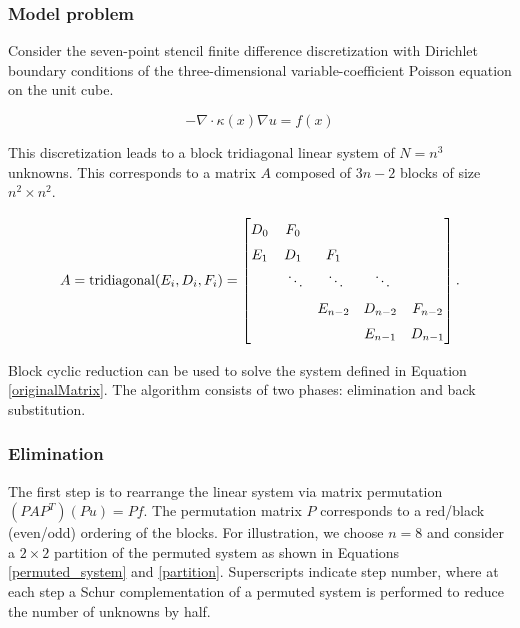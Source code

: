 \documentclass[]{elsarticle}
\begin{document}
\subsubsection{Model problem}

Consider the seven-point stencil finite difference discretization with Dirichlet boundary conditions of the three-dimensional variable-coefficient Poisson equation on the unit cube.

\begin{equation}
-\nabla \cdot \kappa(x) \nabla u=f(x)
\label{probSta}
\end{equation}

This discretization leads to a block tridiagonal linear system of $N=n^3$ unknowns. This corresponds to a matrix $A$ composed of $3n-2$ blocks of size $n^2 \times n^2$.

\begin{equation}
{\renewcommand{\arraystretch}{1.5}
A = \mbox{tridiagonal}(E_{i},D_{i},F_{i}) =
\begin{bmatrix}
D_0 		& F_0 		&  			&  			&  			\\
E_1 		& D_1 		& F_1 		& 			& 			\\
			& ~\ddots 	& ~\ddots 	& ~\ddots 	& 			\\
			&  			& E_{n-2} 	& D_{n-2} 	& F_{n-2} 	\\
			&  			&  			& E_{n-1} 	& D_{n-1} 	\\
\end{bmatrix}.
}
\label{originalMatrix}
\end{equation}

Block cyclic reduction can be used to solve the system defined in Equation \ref{originalMatrix}. The algorithm consists of two phases: elimination and back substitution. 

\subsubsection{Elimination}

The first step is to rearrange the linear system via matrix permutation $(PAP^T)(Pu)=Pf$. The permutation matrix $P$ corresponds to a red/black (even/odd) ordering of the blocks. For illustration, we choose $n=8$ and consider a $2 \times 2$ partition of the permuted system as shown in Equations \ref{permuted_system} and \ref{partition}. Superscripts indicate step number, where at each step a Schur complementation of a permuted system is performed to reduce the number of unknowns by half.
\end{document}
